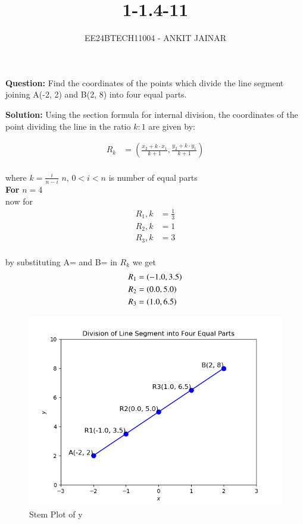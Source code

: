 \documentclass[journal]{IEEEtran}
\begin{document}

\vspace{3cm}


\title{1-1.4-11}
\author{EE24BTECH11004 - ANKIT JAINAR
}
{\let\newpage\relax\maketitle}

\renewcommand{\thefigure}{\theenumi}
\renewcommand{\thetable}{\theenumi}
\setlength{\intextsep}{10pt} %


\renewcommand{\thetable}{\theenumi}

\textbf{Question:} Find the coordinates of the points which divide the line segment joining A(-2, 2) and B(2, 8) into four equal parts.

\textbf{Solution:} Using the section formula for internal division, the coordinates of the point dividing the line in the ratio $k:1$ are given by:

\begin{align}
R_k &= \left( \frac{x_2  + k \cdot x_1}{k+1}, \frac{ y_2 + k \cdot y_1}{k+1} \right)
\end{align} 
\\where $k = \frac{i}{n-i}$ $n$, $0<i<n$ is number of equal parts \\

\textbf{For} $n = 4$ \\


now for
\begin{align}
R_1,k&=\frac{1}{3}\\
R_2,k&=1\\
R_3,k&=3\\
\end{align}

by substituting A= and B= in $R_k$
we get \\
\begin{align}
   R_1&=\left(-1.0,3.5\right)\\
   R_2&=\left(0.0,5.0\right)\\
   R_3&=\left(1.0,6.5\right)\\
\end{align}	

\begin{figure}
    \centering
    \includegraphics[width=0.5\linewidth]{Figure_1.png}
    \caption{Stem Plot of y}
    \label{stemplot}
\end{figure}
\end{document}
